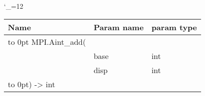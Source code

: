 \begingroup \catcode`\_=12 \tt
\begin{tabular}{lll}
\toprule
\textrm{Name}&\textrm{Param name}&\textrm{param type}\\
\midrule
\hbox to 0pt {MPI.Aint_add(\hss}\\
& base & int\\
& disp & int\\
\hbox to 0pt{) -> int\hss}\\
\bottomrule
\end{tabular}
\endgroup
